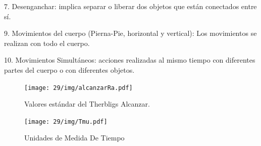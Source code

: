     7. Desenganchar: implica separar o liberar dos objetos que están conectados entre sí.
    
    9. Movimientos del cuerpo (Pierna-Pie, horizontal y vertical): Los movimientos se realizan con todo el cuerpo.
    
    10. Movimientos Simultáneos: acciones realizadas al mismo tiempo con diferentes partes del cuerpo o con diferentes objetos.
    \begin{figure}[H]
        \centering
        \texttt{[image: 29/img/alcanzarRa.pdf]}
        \caption{Valores estándar del Therbligs Alcanzar.}
        \label{fig:alcanzarRa.pdf}
    \end{figure}
    
    \begin{figure}[H]
        \centering
        \texttt{[image: 29/img/Tmu.pdf]}
        \caption{Unidades de Medida De Tiempo}
        \label{fig:Tmu.pdf}
    \end{figure}
    
